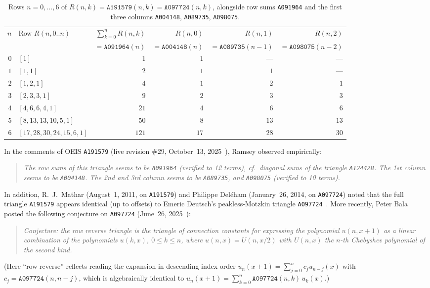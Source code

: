 \documentclass[11pt]{article}
\theoremstyle{definition}
\newcommand{\seq}[1]{\texttt{#1}}
\begin{document}
\begin{table}[ht]
\centering
\caption{Rows $n = 0, \dots, 6$ of $R(n, k) = \seq{A191579}(n, k) = \seq{A097724}(n, k)$, alongside row sums \seq{A091964} and the first three columns \seq{A004148}, \seq{A089735}, \seq{A098075}.}
\label{tab:small-n}
\smallskip
{\small
\begin{tabular}{@{}r l r r r r@{}}
\toprule
$n$ & Row $R(n, 0..n)$ & $\sum_{k=0}^n R(n,k)$ & $R(n,0)$ & $R(n,1)$ & $R(n,2)$ \\
    &                  & $= \seq{A091964}(n)$  & $= \seq{A004148}(n)$ & $= \seq{A089735}(n-1)$ & $= \seq{A098075}(n-2)$ \\
\midrule
$0$ & $[1]$ & $1$ & $1$ & --- & --- \\
$1$ & $[1, 1]$ & $2$ & $1$ & $1$ & --- \\
$2$ & $[1, 2, 1]$ & $4$ & $1$ & $2$ & $1$ \\
$3$ & $[2, 3, 3, 1]$ & $9$ & $2$ & $3$ & $3$ \\
$4$ & $[4, 6, 6, 4, 1]$ & $21$ & $4$ & $6$ & $6$ \\
$5$ & $[8, 13, 13, 10, 5, 1]$ & $50$ & $8$ & $13$ & $13$ \\
$6$ & $[17, 28, 30, 24, 15, 6, 1]$ & $121$ & $17$ & $28$ & $30$ \\
\bottomrule
\end{tabular}
}
\end{table}

In the comments of OEIS \seq{A191579} (live revision \#29, October~13, 2025~\cite{oeis191579}), Ramsey observed empirically:
\begin{quote}\itshape
The row sums of this triangle seems to be \seq{A091964} (verified to 12 terms), cf.\ diagonal sums of the triangle \seq{A124428}. The 1st column seems to be \seq{A004148}. The 2nd and 3rd column seems to be \seq{A089735}, and \seq{A098075} (verified to 10 terms).
\end{quote}
In addition, R.~J.\ Mathar (August~1, 2011, on \seq{A191579}) and Philippe Del\'eham (January~26, 2014, on \seq{A097724}) noted that the full triangle \seq{A191579} appears identical (up to offsets) to Emeric Deutsch's peakless-Motzkin triangle \seq{A097724}~\cite{oeis097724}. More recently, Peter Bala posted the following conjecture on \seq{A097724} (June~26, 2025~\cite{oeis097724}):
\begin{quote}\itshape
Conjecture: the row reverse triangle is the triangle of connection constants for expressing the polynomial $u(n,x+1)$ as a linear combination of the polynomials $u(k,x)$, $0 \le k \le n$, where $u(n,x) = U(n,x/2)$ with $U(n,x)$ the $n$-th Chebyshev polynomial of the second kind.
\end{quote}
(Here ``row reverse'' reflects reading the expansion in descending index order $u_n(x+1) = \sum_{j=0}^n c_j u_{n-j}(x)$ with $c_j = \seq{A097724}(n, n-j)$, which is algebraically identical to $u_n(x+1) = \sum_{k=0}^n \seq{A097724}(n, k)\,u_k(x)$.)
\end{document}
